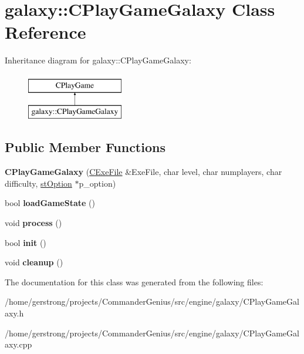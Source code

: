 \hypertarget{classgalaxy_1_1_c_play_game_galaxy}{
\section{galaxy::CPlayGameGalaxy Class Reference}
\label{classgalaxy_1_1_c_play_game_galaxy}
}
Inheritance diagram for galaxy::CPlayGameGalaxy:\begin{figure}[H]
\begin{center}
\leavevmode
\includegraphics[height=2cm]{classgalaxy_1_1_c_play_game_galaxy}
\end{center}
\end{figure}
\subsection*{Public Member Functions}
\begin{DoxyCompactItemize}
\item 
\hypertarget{classgalaxy_1_1_c_play_game_galaxy_a1735f069d5d6ed3a3f286884a825f264}{
{\bfseries CPlayGameGalaxy} (\hyperlink{class_c_exe_file}{CExeFile} \&ExeFile, char level, char numplayers, char difficulty, \hyperlink{structst_option}{stOption} $\ast$p\_\-option)}
\label{classgalaxy_1_1_c_play_game_galaxy_a1735f069d5d6ed3a3f286884a825f264}

\item 
\hypertarget{classgalaxy_1_1_c_play_game_galaxy_acc0ea579e1f2281e80fe239c71d4e3d8}{
bool {\bfseries loadGameState} ()}
\label{classgalaxy_1_1_c_play_game_galaxy_acc0ea579e1f2281e80fe239c71d4e3d8}

\item 
\hypertarget{classgalaxy_1_1_c_play_game_galaxy_ae28a3b26df3dab9544c7f995611a7a31}{
void {\bfseries process} ()}
\label{classgalaxy_1_1_c_play_game_galaxy_ae28a3b26df3dab9544c7f995611a7a31}

\item 
\hypertarget{classgalaxy_1_1_c_play_game_galaxy_a6a960033773a6a0cb35bdfa5c162e50a}{
bool {\bfseries init} ()}
\label{classgalaxy_1_1_c_play_game_galaxy_a6a960033773a6a0cb35bdfa5c162e50a}

\item 
\hypertarget{classgalaxy_1_1_c_play_game_galaxy_a35f29458cca0ea2060936dcd59ea7140}{
void {\bfseries cleanup} ()}
\label{classgalaxy_1_1_c_play_game_galaxy_a35f29458cca0ea2060936dcd59ea7140}

\end{DoxyCompactItemize}


The documentation for this class was generated from the following files:\begin{DoxyCompactItemize}
\item 
/home/gerstrong/projects/CommanderGenius/src/engine/galaxy/CPlayGameGalaxy.h\item 
/home/gerstrong/projects/CommanderGenius/src/engine/galaxy/CPlayGameGalaxy.cpp\end{DoxyCompactItemize}
